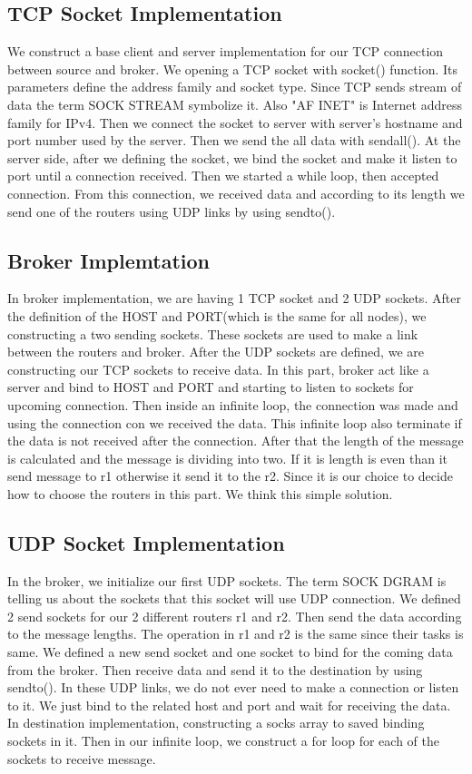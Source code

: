 \documentclass[conference]{IEEEtran}
\begin{document}
\subsection{TCP Socket Implementation}

We construct a base client and server implementation for our TCP connection between source and broker. We opening a TCP socket with socket() function. Its parameters define the address family and socket type. Since TCP sends stream of data the term SOCK STREAM symbolize it. Also "AF INET" is Internet address family for IPv4. Then we connect the socket to server with server's hostname and port number used by the server. Then we send the all data with sendall(). At the server side, after we defining the socket, we bind the socket and make it listen to port until a connection received. Then we started a while loop, then accepted connection. From this connection, we received data and according to its length we send one of the routers using UDP links by using sendto().

\subsection{Broker Implemtation}

In broker implementation, we are having 1 TCP socket and 2 UDP sockets. After the definition of the HOST and PORT(which is the same for all nodes), we constructing a two sending sockets. These sockets are used to make a link between the routers and broker. After the UDP sockets are defined, we are constructing our TCP sockets to receive data. In this part, broker act like a server and bind to HOST and PORT and starting to listen to sockets for upcoming connection. Then inside an infinite loop, the connection was made and using the connection con we received the data. This infinite loop also terminate if the data is not received after the connection. After that the length of the message is calculated and the message is dividing into two. If it is length is even than it send message to r1 otherwise it send it to the r2. Since it is our choice to decide how to choose the routers in this part. We think this simple solution.

\subsection{UDP Socket Implementation}

In the broker, we initialize our first UDP sockets. The term SOCK DGRAM is telling us about the sockets that this socket will use UDP connection. We defined 2 send sockets for our 2 different routers r1 and r2. Then send the data according to the message lengths. The operation in r1 and r2 is the same since their tasks is same. We defined a new send socket and one socket to bind for the coming data from the broker. Then receive data and send it to the destination by using sendto(). In these UDP links, we do not ever need to make a connection or listen to it. We just bind to the related host and port and wait for receiving the data. In destination implementation, constructing a socks array to saved binding sockets in it. Then in our infinite loop, we construct a for loop for each of the sockets to receive message. 
\end{document}
